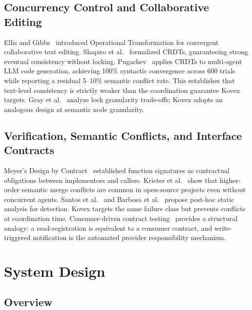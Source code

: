 \documentclass[12pt]{article}
\begin{document}
\subsection{Concurrency Control and Collaborative Editing}

Ellis and Gibbs~\cite{ellis1989ot} introduced Operational Transformation for
convergent collaborative text editing. Shapiro et al.~\cite{shapiro2011crdts}
formalized CRDTs, guaranteeing strong eventual consistency without locking.
Pugachev~\cite{pugachev2025codecrdt} applies CRDTs to multi-agent LLM code
generation, achieving 100\% syntactic convergence across 600 trials while
reporting a residual 5--10\% semantic conflict rate. This establishes that
text-level consistency is strictly weaker than the coordination guarantee
Kovex targets. Gray et al.~\cite{gray1975locks} analyze lock granularity
trade-offs; Kovex adopts an analogous design at semantic node granularity.

\subsection{Verification, Semantic Conflicts, and Interface Contracts}

Meyer's Design by Contract~\cite{meyer1992dbc} established function signatures
as contractual obligations between implementors and callers. Krieter et
al.~\cite{krieter2020mergeconflicts} show that higher-order semantic merge
conflicts are common in open-source projects even without concurrent agents.
Santos et al.~\cite{santos2024semanticconflicts} and Barbosa et
al.~\cite{barbosa2025pointeranalysis} propose post-hoc static analysis for
detection. Kovex targets the same failure class but prevents conflicts at
coordination time. Consumer-driven contract testing~\cite{lehva2019contracts,
aalto2024contracts} provides a structural analogy: a read-registration is
equivalent to a consumer contract, and write-triggered notification is the
automated provider responsibility mechanism.

\section{System Design}

\subsection{Overview}
\end{document}
